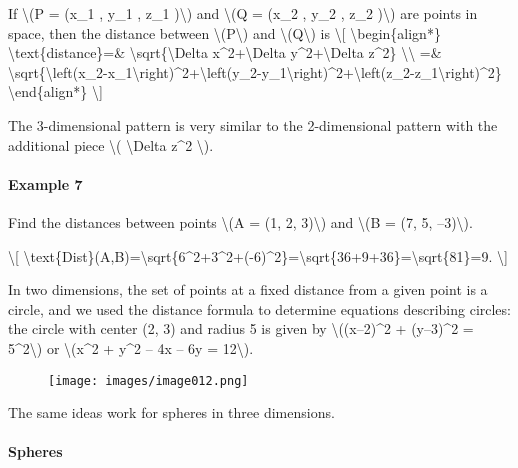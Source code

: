 If \textbackslash{}(P = (x\_1 , y\_1 , z\_1 )\textbackslash{}) and
\textbackslash{}(Q = (x\_2 , y\_2 , z\_2 )\textbackslash{}) are points
in space, then the distance between \textbackslash{}(P\textbackslash{})
and \textbackslash{}(Q\textbackslash{}) is \textbackslash{}{[}
\textbackslash{}begin\{align*\} \textbackslash{}text\{distance\}=\&
\textbackslash{}sqrt\{\textbackslash{}Delta x\^{}2+\textbackslash{}Delta
y\^{}2+\textbackslash{}Delta z\^{}2\} \textbackslash{}\textbackslash{}
=\&
\textbackslash{}sqrt\{\textbackslash{}left(x\_2-x\_1\textbackslash{}right)\^{}2+\textbackslash{}left(y\_2-y\_1\textbackslash{}right)\^{}2+\textbackslash{}left(z\_2-z\_1\textbackslash{}right)\^{}2\}
\textbackslash{}end\{align*\} \textbackslash{}{]}

The 3-dimensional pattern is very similar to the 2-dimensional pattern
with the additional piece \textbackslash{}( \textbackslash{}Delta z\^{}2
\textbackslash{}).

\hypertarget{example-7}{%
\paragraph{Example 7}\label{example-7}}

Find the distances between points \textbackslash{}(A = (1, 2,
3)\textbackslash{}) and \textbackslash{}(B = (7, 5,
--3)\textbackslash{}).

\textbackslash{}{[}
\textbackslash{}text\{Dist\}(A,B)=\textbackslash{}sqrt\{6\^{}2+3\^{}2+(-6)\^{}2\}=\textbackslash{}sqrt\{36+9+36\}=\textbackslash{}sqrt\{81\}=9.
\textbackslash{}{]}

In two dimensions, the set of points at a fixed distance from a given
point is a circle, and we used the distance formula to determine
equations describing circles: the circle with center (2, 3) and radius 5
is given by \textbackslash{}((x--2)\^{}2 + (y--3)\^{}2 =
5\^{}2\textbackslash{}) or \textbackslash{}(x\^{}2 + y\^{}2 -- 4x -- 6y
= 12\textbackslash{}).

\begin{figure}
\centering
\texttt{[image: images/image012.png]}
\caption{}
\end{figure}

The same ideas work for spheres in three dimensions.

\hypertarget{spheres}{%
\paragraph{Spheres}\label{spheres}}

